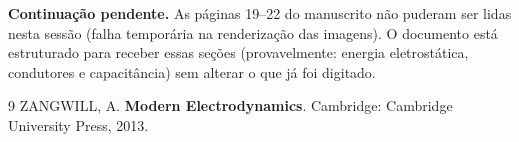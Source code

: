 \begin{nota}
\textbf{Continuação pendente.} As páginas 19--22 do manuscrito não puderam ser
lidas nesta sessão (falha temporária na renderização das imagens). O documento
está estruturado para receber essas seções (provavelmente: energia eletrostática,
condutores e capacitância) sem alterar o que já foi digitado.
\end{nota}

\begin{thebibliography}{9}
  ZANGWILL, A. \textbf{Modern Electrodynamics}. Cambridge: Cambridge University
  Press, 2013.
\end{thebibliography}


